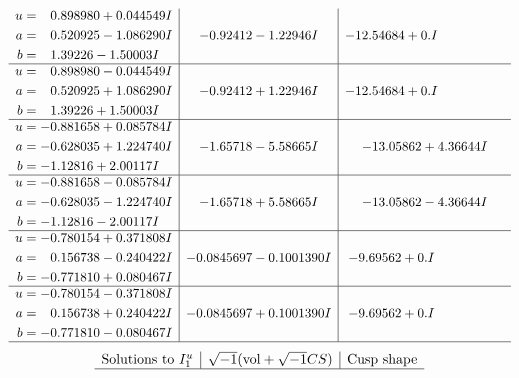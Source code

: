 \documentclass[1p]{elsarticle_modified}
\theoremstyle{definition}
\newcommand{\I}{\sqrt{-1}}
\begin{document}
$$\begin{array}{c|c|c}
\begin{aligned}
u &= \phantom{-}0.898980 + 0.044549 I \\
a &= \phantom{-}0.520925 - 1.086290 I \\
b &= \phantom{-}1.39226 - 1.50003 I\end{aligned}
 & -0.92412 - 1.22946 I & -12.54684 + 0. I\phantom{ +0.000000I} \\ \hline\begin{aligned}
u &= \phantom{-}0.898980 - 0.044549 I \\
a &= \phantom{-}0.520925 + 1.086290 I \\
b &= \phantom{-}1.39226 + 1.50003 I\end{aligned}
 & -0.92412 + 1.22946 I & -12.54684 + 0. I\phantom{ +0.000000I} \\ \hline\begin{aligned}
u &= -0.881658 + 0.085784 I \\
a &= -0.628035 + 1.224740 I \\
b &= -1.12816 + 2.00117 I\end{aligned}
 & -1.65718 - 5.58665 I & -13.05862 + 4.36644 I \\ \hline\begin{aligned}
u &= -0.881658 - 0.085784 I \\
a &= -0.628035 - 1.224740 I \\
b &= -1.12816 - 2.00117 I\end{aligned}
 & -1.65718 + 5.58665 I & -13.05862 - 4.36644 I \\ \hline\begin{aligned}
u &= -0.780154 + 0.371808 I \\
a &= \phantom{-}0.156738 - 0.240422 I \\
b &= -0.771810 + 0.080467 I\end{aligned}
 & -0.0845697 - 0.1001390 I & -9.69562 + 0. I\phantom{ +0.000000I} \\ \hline\begin{aligned}
u &= -0.780154 - 0.371808 I \\
a &= \phantom{-}0.156738 + 0.240422 I \\
b &= -0.771810 - 0.080467 I\end{aligned}
 & -0.0845697 + 0.1001390 I & -9.69562 + 0. I\phantom{ +0.000000I}\\
 \hline 
 \end{array}$$\newpage$$\begin{array}{c|c|c}  
\text{Solutions to }I^u_{1}& \I (\text{vol} + \sqrt{-1}CS) & \text{Cusp shape}\\
 \hline 

\end{array}$$
\end{document}
